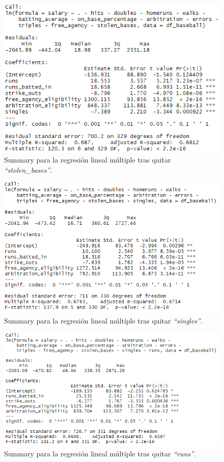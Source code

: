 \documentclass[a4paper,12pt, oneside]{book}
\begin{document}
\begin{figure}[H]
\centering
\includegraphics[scale=0.7]{images/multifit12.PNG}
\caption{Summary para la regresión lineal múltiple tras quitar \textit{``stolen\_bases''}.}
\end{figure}

\begin{figure}[H]
\centering
\includegraphics[scale=0.7]{images/multifit13.PNG}
\caption{Summary para la regresión lineal múltiple tras quitar \textit{``singles''}.}
\end{figure}

\begin{figure}[H]
\centering
\includegraphics[scale=0.7]{images/multifit14.PNG}
\caption{Summary para la regresión lineal múltiple tras quitar \textit{``runs''}.}
\end{figure}
\end{document}
